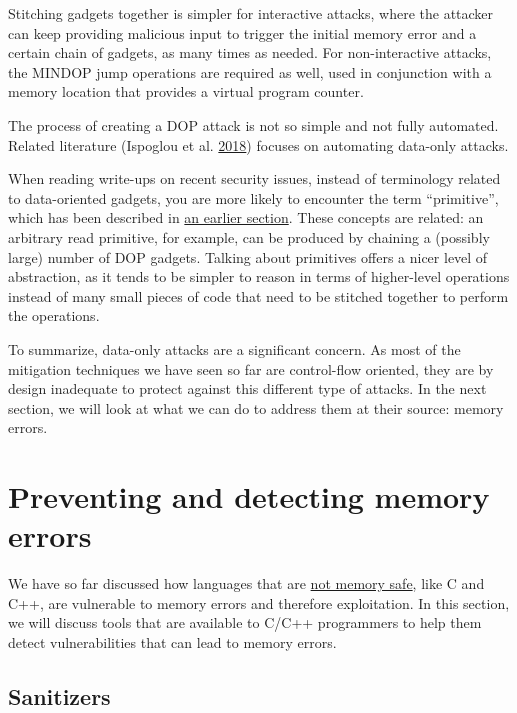 \documentclass[a4paper,]{report}
\begin{document}
Stitching gadgets together is simpler for interactive attacks, where the
attacker can keep providing malicious input to trigger the initial
memory error and a certain chain of gadgets, as many times as needed.
For non-interactive attacks, the MINDOP jump operations are required as
well, used in conjunction with a memory location that provides a virtual
program counter.

The process of creating a DOP attack is not so simple and not fully
automated. Related literature (Ispoglou et al.
\protect\hyperlink{ref-Ispoglou2018}{2018}) focuses on automating
data-only attacks.

When reading write-ups on recent security issues, instead of terminology
related to data-oriented gadgets, you are more likely to encounter the
term ``primitive'', which has been described in
\protect\hyperlink{exploitation-primitives}{an earlier section}. These
concepts are related: an arbitrary read primitive, for example, can be
produced by chaining a (possibly large) number of DOP gadgets. Talking
about primitives offers a nicer level of abstraction, as it tends to be
simpler to reason in terms of higher-level operations instead of many
small pieces of code that need to be stitched together to perform the
operations.

To summarize, data-only attacks are a significant concern. As most of
the mitigation techniques we have seen so far are control-flow oriented,
they are by design inadequate to protect against this different type of
attacks. In the next section, we will look at what we can do to address
them at their source: memory errors.

\hypertarget{preventing-and-detecting-memory-errors}{%
\section{Preventing and detecting memory
errors}\label{preventing-and-detecting-memory-errors}}

We have so far discussed how languages that are
\protect\hyperlink{a-bit-of-background-on-memory-vulnerabilities}{not
memory safe}, like C and C++, are vulnerable to memory errors and
therefore exploitation. In this section, we will discuss tools that are
available to C/C++ programmers to help them detect
vulnerabilities that can lead to memory errors.

\hypertarget{sanitizers}{%
\subsection{Sanitizers}\label{sanitizers}}
\end{document}
